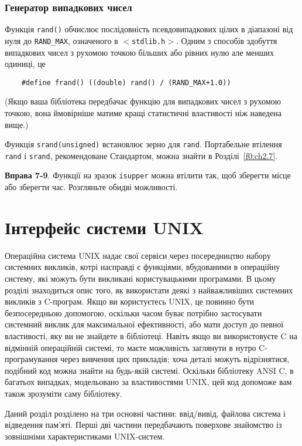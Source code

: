 \documentclass[a4paper,12pt]{book}
\begin{document}
\subsection{Генератор випадкових чисел}


  Функція \texttt{rand()} обчислює послідовність псевдовипадкових цілих в діапазоні від
  нуля до \texttt{RAND\_MAX}, означеного в \texttt{\mbox{$<$}stdlib.h\mbox{$>$}}. Одним з способів
  здобуття випадкових чисел з рухомою точкою більших або рівних нулю але менших одиниці,
  це
  \begin{verbatim}
    #define frand() ((double) rand() / (RAND_MAX+1.0))
  \end{verbatim}

  (Якщо ваша бібліотека передбачає функцію для випадкових чисел з рухомою точкою, вона
  ймовірніше матиме кращі статистичні властивості ніж наведена вище.)

  Функція \texttt{srand(unsigned)} встановлює зерно для \texttt{rand}. Портабельне
  втілення \texttt{rand} і \texttt{srand}, рекомендоване Стандартом, можна знайти в 
  Розділі~\ref{f0:ch2.7}.
  
  \textbf{Вправа 7-9}. Функції на зразок \texttt{isupper} можна втілити так, щоб зберегти
  місце або зберегти час. Розгляньте обидві можливості.

\chapter{Інтерфейс системи UNIX}

\label{f0:ch8}
  Операційна система UNIX надає свої сервіси через посередництво набору системних
  викликів, котрі насправді є функціями, вбудованими в операційну систему, які
  можуть бути викликані користувацькими програмами. В цьому розділі знаходиться опис
  того, як використати деякі з найважливіших системних викликів з C-програм. Якщо ви
  користуєтесь UNIX, це повинно бути безпосередньою допомогою, оскільки часом буває
  потрібно застосувати системний виклик для максимальної ефективності, або мати доступ до
  певної властивості, яку ви не знайдете в бібліотеці. Навіть якщо ви використовуєте C на
  відмінній операційній системі, то маєте можливість заглянути в нутро C-програмування
  через вивчення цих прикладів; хоча деталі можуть відрізнятися, подібний код можна
  знайти на будь-якій системі. Оскільки бібліотеку ANSI C, в багатьох випадках,
  модельовано за властивостями UNIX, цей код допоможе вам також зрозуміти саму
  бібліотеку.

  Даний розділ розділено на три основні частини: ввід/вивід, файлова система і
  відведення пам'яті. Перші дві частини передбачають поверхове знайомство із
  зовнішніми характеристиками UNIX-систем.
\end{document}
